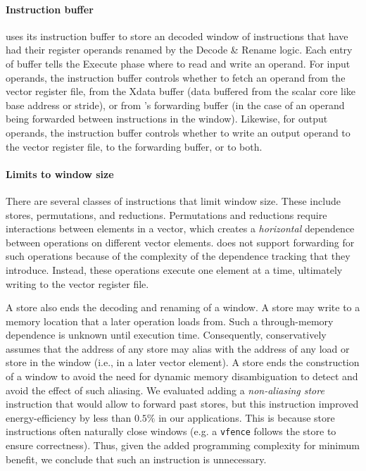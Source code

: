 \paragraph{Instruction buffer}
\manic uses its instruction buffer to store an decoded window of
instructions that have had their register operands renamed by the Decode \& Rename logic.
% 
Each entry of buffer tells the Execute phase where to read and write an operand.
% 
For input operands, the instruction buffer controls whether to fetch an operand from the
vector register file, from the Xdata buffer (data buffered from the scalar core like base address or stride), or from \manic's forwarding buffer (in the case of an
operand being forwarded between instructions in the window).
%
Likewise, for output operands, the instruction buffer controls whether to write
an output operand to the vector register file, to the forwarding buffer, or to both.

\paragraph{Limits to window size}
There are several classes of instructions that limit window size.
%
These include stores, permutations, and reductions.
%
Permutations and reductions require interactions between elements in a vector, which
creates a {\em horizontal} dependence between operations on different vector elements.
%
\manic does not support forwarding for such operations because of the complexity of
the dependence tracking that they introduce.  
% 
Instead, these operations execute one element at a time, ultimately writing to the vector register file. 

A store also ends the decoding and renaming of a window.  A store may write to a memory
location that a later operation loads from. Such a through-memory dependence is 
unknown until execution time.  Consequently, \manic conservatively assumes
that the address of any store may alias with the address of any load or store in the window (i.e., in a later vector element).
A store ends the construction of a window to avoid the need for dynamic memory disambiguation to
detect and avoid the effect of such aliasing.
% 
We evaluated adding a \emph{non-aliasing store} instruction that would allow \manic to forward past stores,
but this instruction improved energy-efficiency by less than $0.5\%$ in our applications.
% 
This is because store instructions often naturally close windows (e.g. a {\tt vfence} follows the store to ensure correctness).
% 
Thus, given the added programming complexity for minimum benefit, we conclude that such an instruction is unnecessary.
%


